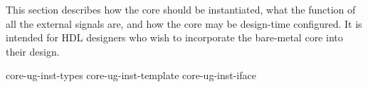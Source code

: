 
\label{sec:core-ug-inst}

This section describes how the core should be instantiated, what the function of
all the external signals are, and how the core may be design-time configured. It
is intended for HDL designers who wish to incorporate the bare-metal core into
their design. 

{core-ug-inst-types}
{core-ug-inst-template}
{core-ug-inst-iface}
